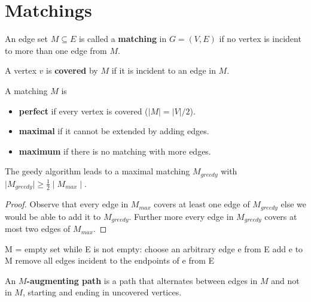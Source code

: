 \section{Matchings}

\begin{definition}
    An edge set $M \subseteq E$ is called a \textbf{matching} in $G = (V, E)$ if no vertex is incident to more than one edge from $M$.
\end{definition}

\begin{definition}
    A vertex $v$ is \textbf{covered} by $M$ if it is incident to an edge in $M$.
\end{definition}

\begin{definition}
    A matching $M$ is
    \begin{itemize}
        \item \textbf{perfect} if every vertex is covered ($|M| = |V|/2$).
        \item \textbf{maximal} if it cannot be extended by adding edges.
        \item \textbf{maximum} if there is no matching with more edges.
    \end{itemize}
\end{definition}

\begin{theorem}
    The geedy algorithm leads to a maximal matching $M_{greedy}$ with $\mid M_{greedy} \mid \geq \frac{1}{2} \mid M_{max} \mid$.
\end{theorem}

\begin{proof}
    Observe that every edge in $M_{max}$ covers at least one edge of $M_{greedy}$ else we would be able to add it to $M_{greedy}$. Further more every edge in $M_{greedy}$ covers at most two edges of $M_{max}$.
\end{proof}

\begin{algorithm}
M = empty set
while E is not empty:
    choose an arbitrary edge e from E
    add e to M
    remove all edges incident to the endpoints of e from E
\end{algorithm}

\begin{definition}
    An \textbf{$M$-augmenting path} is a path that alternates between edges in $M$ and not in $M$, starting and ending in uncovered vertices.
\end{definition}

